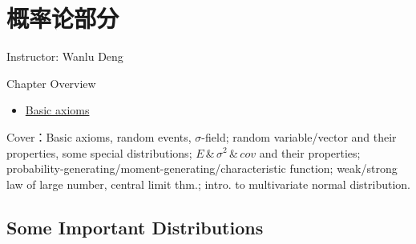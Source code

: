 \section{概率论部分}\label{Section1Probability}
\begin{center}
    Instructor: Wanlu Deng
\end{center}

    Chapter Overview
\begin{itemize}[topsep=2pt,itemsep=2pt]
    \item \hyperlink{Basic axioms}{Basic axioms}
\end{itemize}

    









    Cover：Basic axioms, random events, $\sigma$-field; random variable/vector and their properties, some special distributions; $E$\,\&\,$\sigma^2$\,\&\,$cov$ and their properties; probability-generating/moment-generating/characteristic function; weak/strong law of large number, central limit thm.; intro. to multivariate normal distribution.



\subsection{Some Important Distributions}\label{SectionImportantDistributions}

